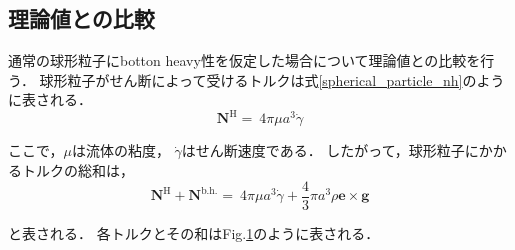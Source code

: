 \subsection{理論値との比較}
通常の球形粒子にbotton heavy性を仮定した場合について理論値との比較を行う．
球形粒子がせん断によって受けるトルクは式\eqref{spherical_particle_nh}のように表される\cite{}．
    \begin{equation}
        \boldsymbol{N}^\mathrm{H} = \
            4 \pi \mu a^3 \dot{\gamma}
        \label{spherical_particle_nh}
    \end{equation}

\noindent
ここで，$\mu$は流体の粘度，
$\dot{\gamma}$はせん断速度である．
したがって，球形粒子にかかるトルクの総和は，
    \begin{equation}
        \boldsymbol{N}^\mathrm{H} + \boldsymbol{N}^\mathrm{b.h.} = \
        4 \pi \mu a^3 \dot{\gamma} + \frac{4}{3} \pi a^3 \rho \boldsymbol{e} \times \boldsymbol{g}
    \end{equation}

\noindent
と表される．
各トルクとその和はFig.\ref{}のように表される．

    \begin{figure}
        \label{}
        \caption{}
    \end{figure}
